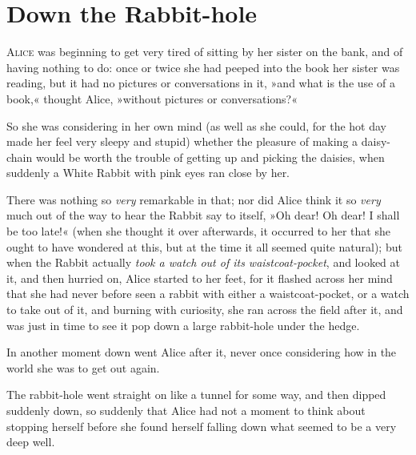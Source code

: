 


\chapter{Down the Rabbit-hole}
\lettrine[lines=4,findent=2pt]{A}{lice} was beginning to get very tired of sitting by her sister on the bank, and of having nothing to do: once or twice she had peeped into the book her sister was reading, but it had no pictures or conversations in it, »and what is the use of a book,« thought Alice, »without pictures or conversations?«

So she was considering in her own mind (as well as she could, for the hot day made her feel very sleepy and stupid) whether the pleasure of making a daisy-chain would be worth the trouble of getting up and picking the daisies, when suddenly a White Rabbit with pink eyes ran close by her.

There was nothing so \textit{very} remarkable in that; nor did Alice think it so \textit{very} much out of the way to hear the Rabbit say to itself, »Oh dear! Oh dear! I shall be too late!« (when she thought it over afterwards, it occurred to her that she ought to have wondered at this, but at the time it all seemed quite natural); but when the Rabbit actually \textit{took a watch out of its waistcoat-pocket}, and looked at it, and then hurried on, Alice started to her feet, for it flashed across her mind that she had never before seen a rabbit with either a waistcoat-pocket, or a watch to take out of it, and burning with curiosity, she ran across the field after it, and was just in time to see it pop down a large rabbit-hole under the hedge.

In another moment down went Alice after it, never once considering how in the world she was to get out again.

The rabbit-hole went straight on like a tunnel for some way, and then dipped suddenly down, so suddenly that Alice had not a moment to think about stopping herself before she found herself falling down what seemed to be a very deep well.

